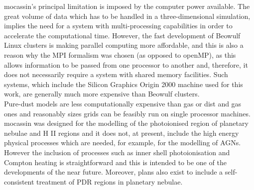 \documentclass[11pt]{article}
\begin{document}
   {\sc mocassin}'s principal limitation is imposed by the computer power available. 
   The great volume of data which has to be handled in a three-dimensional 
   simulation, implies the need for a system with multi-processing capabilities in 
   order to accelerate the computational time. However, the fast development of 
   Beowulf Linux clusters is making parallel computing more affordable, and this is
   also a reason why the MPI formalism was chosen (as opposed to openMP), as this 
   allows information to be passed from one processor to another and, therefore, 
   it does not necessarily require a system with shared memory facilities. Such 
   systems, which include the Silicon Graphics Origin 2000 machine used for this 
   work, are generally much more expensive than Beowulf clusters. \\

   Pure-dust models are less computationally expensive than gas or dist and gas ones
   and reasonably sizes grids can be feasibly run on single processor machines. \\

   {\sc mocassin} was designed for the modelling of the photoionised region of planetary 
   nebulae and H II regions and it does not, at present, include the high energy 
   physical processes which are needed, for example,  for the modelling of AGNs. 
   However the inclusion of processes such as inner shell photoionisation and Compton 
   heating is straightforward and this is intended to be one of the developments of the near 
   future.  Moreover, plans also exist to include a self-consistent treatment of PDR regions in
   planetary nebulae.\\
\end{document}
